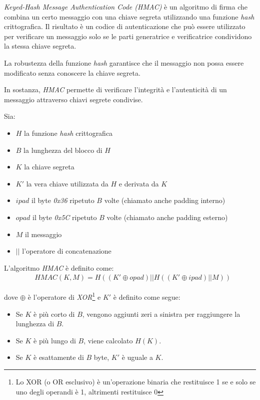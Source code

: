 \emph{Keyed-Hash Message Authentication Code (HMAC)} è un algoritmo di firma che combina un certo messaggio con una chiave segreta utilizzando una funzione \emph{hash} crittografica.
Il risultato è un codice di autenticazione che può essere utilizzato per verificare un messaggio solo se le parti generatrice e verificatrice condividono la stessa chiave segreta.

La robustezza della funzione \emph{hash} garantisce che il messaggio non possa essere modificato senza conoscere la chiave segreta.

In sostanza, \emph{HMAC} permette di verificare l'integrità e l'autenticità di un messaggio attraverso chiavi segrete condivise.

\noindent Sia:
\begin{itemize}
	\item $H$ la funzione \emph{hash} crittografica
	\item $B$ la lunghezza del blocco di $H$
	\item $K$ la chiave segreta
	\item $K'$ la vera chiave utilizzata da $H$ e derivata da $K$
	\item $ipad$ il byte \emph{0x36} ripetuto $B$ volte (chiamato anche padding interno)
	\item $opad$ il byte \emph{0x5C} ripetuto $B$ volte (chiamato anche padding esterno)
	\item $M$ il messaggio
	\item $||$ l'operatore di concatenazione
\end{itemize}

\noindent L'algoritmo \emph{HMAC} è definito come:
\begin{equation}
	\begin{aligned}
		&HMAC(K, M) = H((K' \oplus opad) || H((K' \oplus ipad) || M))
	\end{aligned}
\end{equation}

\noindent dove $\oplus$ è l'operatore di \emph{XOR}\footnote{Lo XOR (o OR esclusivo) è un'operazione binaria che restituisce 1 se e solo se uno degli operandi è 1, altrimenti restituisce 0} e $K'$ è definito come segue:
\begin{itemize}
	\item Se $K$ è più corto di $B$, vengono aggiunti zeri a sinistra per raggiungere la lunghezza di $B$.
	\item Se $K$ è più lungo di $B$, viene calcolato $H(K)$.
	\item Se $K$ è esattamente di $B$ byte, $K'$ è uguale a $K$.
\end{itemize}

